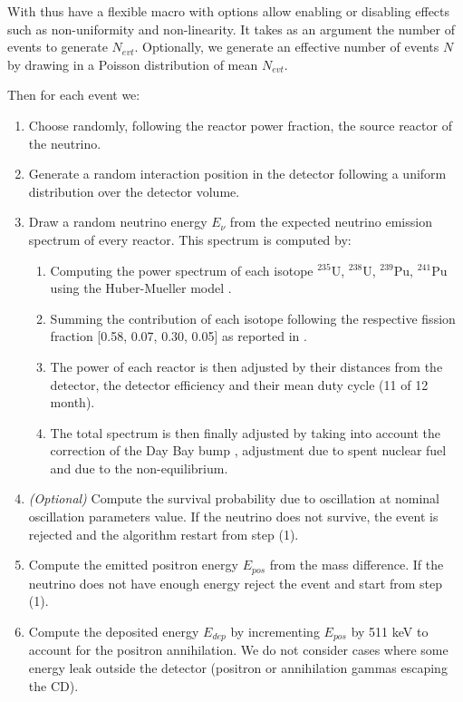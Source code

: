 \documentclass[../main.tex]{subfiles}
\begin{document}
With thus have a flexible macro with options allow enabling or disabling effects such as non-uniformity and non-linearity. It takes as an argument the number of events to generate $N_{evt}$. Optionally, we generate an effective number of events $N$ by drawing in a Poisson distribution of mean $N_{evt}$.

Then for each event we:
\begin{enumerate}
  \item Choose randomly, following the reactor power fraction, the source reactor of the neutrino.
  \item Generate a random interaction position in the detector following a uniform distribution over the detector volume.
  \item Draw a random neutrino energy $E_{\nu}$ from the expected neutrino emission spectrum of every reactor. This spectrum is computed by:
    \begin{enumerate}
      \item Computing the power spectrum of each isotope $^{235}$U, $^{238}$U, $^{239}$Pu, $^{241}$Pu using the Huber-Mueller model \cite{huber_determination_2011, mueller_improved_2011}.
      \item Summing the contribution of each isotope following the respective fission fraction [0.58, 0.07, 0.30, 0.05] as reported in \cite{ma_improved_2013}.
      \item The power of each reactor is then adjusted by their distances from the detector, the detector efficiency and their mean duty cycle (11 of 12 month).
      \item The total spectrum is then finally adjusted by taking into account the correction of the Day Bay bump \cite{daya_bay_collaboration_measurement_2016}, adjustment due to spent nuclear fuel and due to the non-equilibrium.
    \end{enumerate}
  \item \textit{(Optional)} Compute the survival probability due to oscillation at nominal oscillation parameters value. If the neutrino does not survive, the event is rejected and the algorithm restart from step (1).
  \item Compute the emitted positron energy $E_{pos}$ from the mass difference. If the neutrino does not have enough energy reject the event and start from step (1).
  \item Compute the deposited energy $E_{dep}$ by incrementing $E_{pos}$ by 511 keV to account for the positron annihilation. We do not consider cases where some energy leak outside the detector (positron or annihilation gammas escaping the CD).

\end{enumerate}
\end{document}
